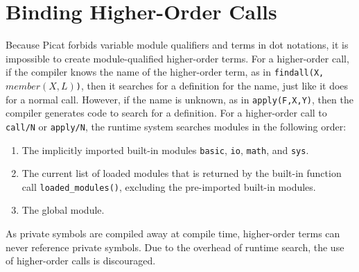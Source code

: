 \section{Binding Higher-Order Calls}
Because Picat forbids variable module qualifiers and terms in dot notations, it is impossible to create module-qualified higher-order terms. For a higher-order call, if the compiler knows the name of the higher-order term, as in \texttt{findall(X,$member(X,L)$)}, then it searches for a definition for the name, just like it does for a normal call. However, if the name is unknown, as in \texttt{apply(F,X,Y)}, then the compiler generates code to search for a definition. For a higher-order call to \texttt{call/N} or \texttt{apply/N}, the runtime system searches modules in the following order:
\begin{enumerate}
\item The implicitly imported built-in modules \texttt{basic}, \texttt{io}, \texttt{math},  and \texttt{sys}.
\item The current list of loaded modules that is returned by the built-in function call \texttt{loaded\_modules()}, excluding the pre-imported built-in modules.
\item The global module.
\end{enumerate}
As private symbols are compiled away at compile time, higher-order terms can never reference private symbols. Due to the overhead of runtime search, the use of higher-order calls is discouraged.


